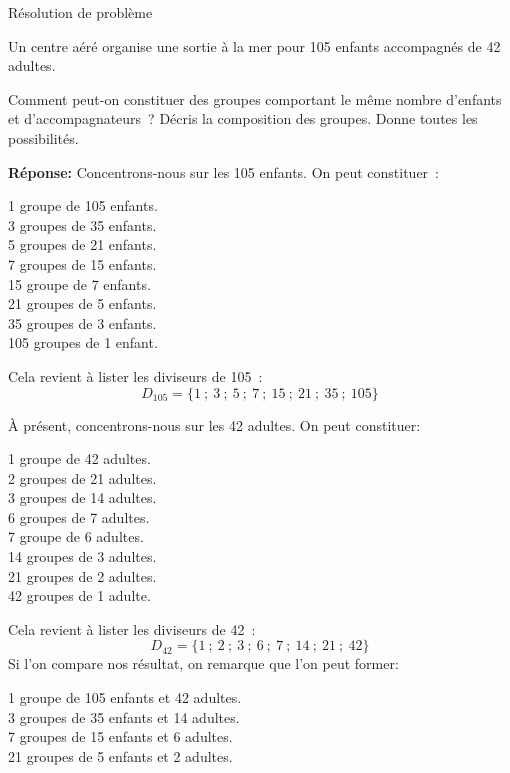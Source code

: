 \documentclass[a4paper,12pt]{report}
\begin{document}
\begin{resolu}{Résolution de problème}{Un centre aéré organise une sortie à la mer pour 105 enfants accompagnés de 42 adultes. 

Comment peut-on constituer des groupes comportant le même nombre d'enfants et d'accompagnateurs~? Décris la composition des groupes. Donne toutes les possibilités.

{{\bfseries Réponse:} \color{blue} 
    Concentrons-nous sur les 105 enfants. On peut constituer~:

    \begin{center}
{\raggedright
        \begin{multicols}{2}
            1 groupe de 105 enfants. \\
            3 groupes de 35 enfants. \\
            5 groupes de 21 enfants. \\
            7 groupes de 15 enfants. \\
            15 groupe de 7 enfants. \\
            21 groupes de 5 enfants. \\
            35 groupes de 3 enfants. \\
            105 groupes de 1 enfant. \\
\end{multicols}}
\end{center}

Cela revient à lister les diviseurs de 105~: 
\[D_{105}=\{1~;~3~;~5~;~7~;~15~;~21~;~35~;~105\}\]

    À présent, concentrons-nous sur les 42 adultes. On peut constituer:
    \begin{center}

{\raggedright
        \begin{multicols}{2}
		            1 groupe de 42 adultes.\\ 
        2 groupes de 21 adultes.\\ 
    3 groupes de 14 adultes.\\
 6 groupes de 7 adultes.\\
 7 groupe de 6 adultes.\\
 14 groupes de 3 adultes.\\
  21 groupes de 2 adultes.\\
 42 groupes de 1 adulte.\\
\end{multicols}}
    \end{center}

    Cela revient à lister les diviseurs de 42~: 
    \[D_{42}=\{1~;~2~;~3~;~6~;~7~;~14~;~21~;~42\}\]
    Si l'on compare nos résultat, on remarque que l'on peut former: 
    \begin{center}
	    {\raggedright
 1 groupe de 105 enfants et 42 adultes.\\ 
 3 groupes de 35 enfants et 14 adultes.\\
 7 groupes de 15 enfants et 6 adultes. \\ 
21 groupes de 5 enfants et 2 adultes. \\}
    \end{center}

}}
\end{resolu}
\end{document}

